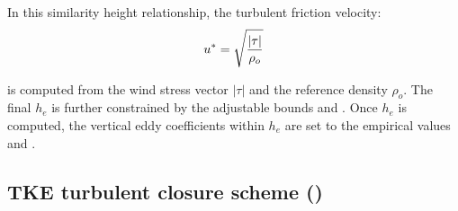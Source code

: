 \documentclass[../tex_main/NEMO_manual]{subfiles}
\begin{document}
In this similarity height relationship, the turbulent friction velocity:
\begin{equation}
         u^{*} = \sqrt \frac {|\tau|} {\rho_o}  	\\
\end{equation}

is computed from the wind stress vector $|\tau|$ and the reference density $ \rho_o$.
The final $h_{e}$ is further constrained by the adjustable bounds  and .
Once $h_{e}$ is computed, the vertical eddy coefficients within $h_{e}$ are set to 
the empirical values  and  \citep{Lermusiaux2001}.

\subsection{TKE turbulent closure scheme (\protect{})}
\label{subsec:ZDF_tke}

\end{document}
